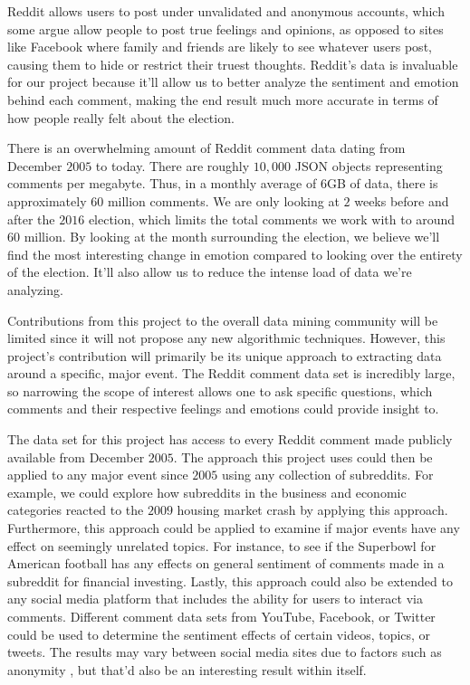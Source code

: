 \documentclass[letterpaper]{article}
\begin{document}
Reddit allows users to post under unvalidated and anonymous accounts, which some argue allow people to post true feelings and opinions, as opposed to sites like Facebook where family and friends are likely to see whatever users post, causing them to hide or restrict their truest thoughts. Reddit’s data is invaluable for our project because it’ll allow us to better analyze the sentiment and emotion behind each comment, making the end result much more accurate in terms of how people really felt about the election.

There is an overwhelming amount of Reddit comment data dating from December $2005$ to today. There are roughly $10,000$ JSON objects representing comments per megabyte. Thus, in a monthly average of $6$GB of data, there is approximately $60$ million comments. We are only looking at $2$ weeks before and after the $2016$ election, which limits the total comments we work with to around $60$ million. By looking at the month surrounding the election, we believe we’ll find the most interesting change in emotion compared to looking over the entirety of the election. It’ll also allow us to reduce the intense load of data we’re analyzing.

Contributions from this project to the overall data mining community will be limited since it will not propose any new algorithmic techniques. However, this project’s contribution will primarily be its unique approach to extracting data around a specific, major event. The Reddit comment data set is incredibly large, so narrowing the scope of interest allows one to ask specific questions, which comments and their respective feelings and emotions could provide insight to.

The data set for this project has access to every Reddit comment made publicly available from December $2005$. The approach this project uses could then be applied to any major event since $2005$ using any collection of subreddits. For example, we could explore how subreddits in the business and economic categories reacted to the $2009$ housing market crash by applying this approach. Furthermore, this approach could be applied to examine if major events have any effect on seemingly unrelated topics. For instance, to see if the Superbowl for American football has any effects on general sentiment of comments made in a subreddit for financial investing. Lastly, this approach could also be extended to any social media platform that includes the ability for users to interact via comments. Different comment data sets from YouTube, Facebook, or Twitter could be used to determine the sentiment effects of certain videos, topics, or tweets. The results may vary between social media sites due to factors such as anonymity , but that’d also be an interesting result within itself.
\end{document}
